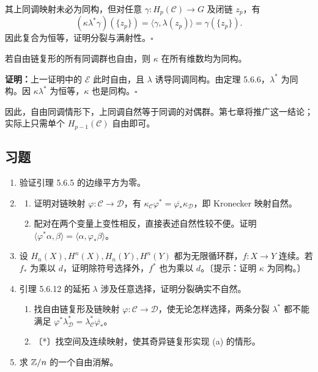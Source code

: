 其上同调映射未必为同构，但对任意 $\gamma:H_p(\mathcal C)\to G$ 及闭链 $z_p$，有
\[
(\kappa\lambda^*\gamma)(\{z_p\})=\langle\gamma,\lambda(z_p)\rangle=\gamma(\{z_p\}).
\]
因此复合为恒等，证明分裂与满射性。\hfill$\square$

若自由链复形的所有同调群也自由，则 $\kappa$ 在所有维数均为同构。

\textbf{证明：}上一证明中的 $\mathcal E$ 此时自由，且 $\lambda$ 诱导同调同构。由定理 5.6.6，$\lambda^*$ 为同构。因 $\kappa\lambda^*$ 为恒等，$\kappa$ 也是同构。\hfill$\square$

因此，自由同调情形下，上同调自然等于同调的对偶群。第七章将推广这一结论；实际上只需单个 $H_{p-1}(\mathcal C)$ 自由即可。

\subsection*{习题}
\begin{enumerate}
\item 验证引理 5.6.5 的边缘平方为零。
\item \begin{enumerate}[label=(\alph*)]
\item 证明对链映射 $\varphi:\mathcal C\to\mathcal D$，有 $\kappa_{\mathcal C}\varphi^*=\overline{\varphi_*}\kappa_{\mathcal D}$，即 Kronecker 映射自然。
\item 配对在两个变量上变性相反，直接表述自然性较不便。证明 $\langle\varphi^*\alpha,\beta\rangle=\langle\alpha,\varphi_*\beta\rangle$。
\end{enumerate}
\item 设 $H_n(X),H^n(X),H_n(Y),H^n(Y)$ 都为无限循环群，$f:X\to Y$ 连续。若 $f_*$ 为乘以 $d$，证明除符号选择外，$f^*$ 也为乘以 $d$。〔提示：证明 $\kappa$ 为同构。〕
\item 引理 5.6.12 的延拓 $\lambda$ 涉及任意选择，证明分裂确实不自然。
\begin{enumerate}[label=(\alph*)]
\item 找自由链复形及链映射 $\varphi:\mathcal C\to\mathcal D$，使无论怎样选择，两条分裂 $\lambda^*$ 都不能满足 $\varphi^*\lambda_{\mathcal D}^*=\lambda_{\mathcal C}^*\overline{\varphi_*}$。
\item 〔*〕找空间及连续映射，使其奇异链复形实现 (a) 的情形。
\end{enumerate}
\item 求 $\mathbb{Z}/n$ 的一个自由消解。
\end{enumerate}
